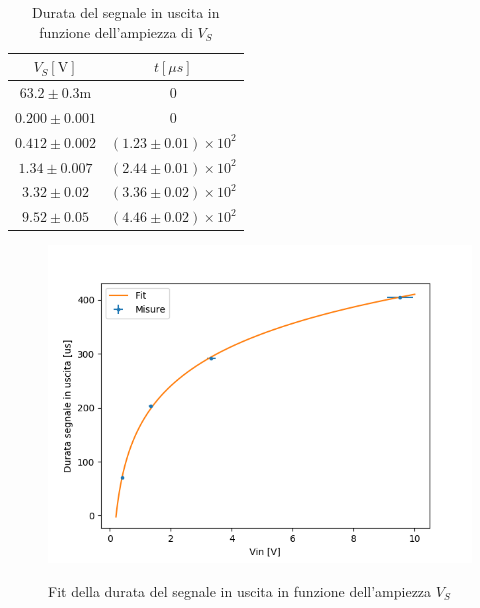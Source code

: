 \documentclass{article}
\begin{document}
	\begin{table}[h]
		\label{tab:durata}
		\begin{center}
			\begin{tabular}{cc}
				\hline
				$V_S [\mathrm{V}]$&$t[\mu s]$ \\
				\hline
				$63.2\pm0.3 \mathrm{m}$ & $0$ \\
				$0.200\pm0.001$ & $0$ \\
				$0.412\pm0.002$ & $(1.23\pm0.01)\times 10^{2}$ \\
				$1.34\pm0.007$ & $(2.44\pm0.01)\times 10^{2}$ \\
				$3.32\pm0.02$ & $(3.36\pm0.02)\times 10^{2}$ \\
				$9.52\pm0.05$ & 	$(4.46\pm0.02)\times 10^{2}$ \\
			\end{tabular}
		\end{center}
		\caption{Durata del segnale in uscita in funzione dell'ampiezza di $V_S$}
	\end{table}
	
	\begin{figure}
		\centering
		\includegraphics[width=\linewidth]{immagini/1c.png}
		\label{fit:1c}
		\caption{Fit della durata del segnale in uscita in funzione dell'ampiezza $V_S$}
	\end{figure}
	
\end{document}
